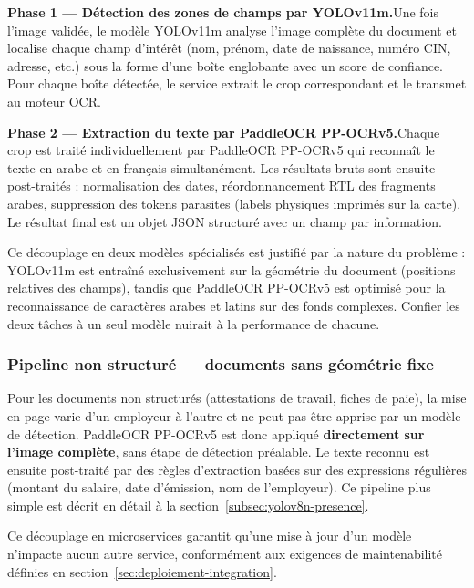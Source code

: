 \medskip
\noindent\textbf{Phase 1 — Détection des zones de champs par YOLOv11m.}\quad Une fois l'image validée, le modèle YOLOv11m analyse l'image complète du document et localise chaque champ d'intérêt (nom, prénom, date de naissance, numéro CIN, adresse, etc.) sous la forme d'une boîte englobante avec un score de confiance. Pour chaque boîte détectée, le service extrait le crop correspondant et le transmet au moteur OCR.

\medskip
\noindent\textbf{Phase 2 — Extraction du texte par PaddleOCR PP-OCRv5.}\quad Chaque crop est traité individuellement par PaddleOCR PP-OCRv5 qui reconnaît le texte en arabe et en français simultanément. Les résultats bruts sont ensuite post-traités : normalisation des dates, réordonnancement RTL des fragments arabes, suppression des tokens parasites (labels physiques imprimés sur la carte). Le résultat final est un objet JSON structuré avec un champ par information.

Ce découplage en deux modèles spécialisés est justifié par la nature du problème : YOLOv11m est entraîné exclusivement sur la géométrie du document (positions relatives des champs), tandis que PaddleOCR PP-OCRv5 est optimisé pour la reconnaissance de caractères arabes et latins sur des fonds complexes. Confier les deux tâches à un seul modèle nuirait à la performance de chacune.

\subsubsection{Pipeline non structuré --- documents sans géométrie fixe}

Pour les documents non structurés (attestations de travail, fiches de paie), la mise en page varie d'un employeur à l'autre et ne peut pas être apprise par un modèle de détection. PaddleOCR PP-OCRv5 est donc appliqué \textbf{directement sur l'image complète}, sans étape de détection préalable. Le texte reconnu est ensuite post-traité par des règles d'extraction basées sur des expressions régulières (montant du salaire, date d'émission, nom de l'employeur). Ce pipeline plus simple est décrit en détail à la section~\ref{subsec:yolov8n-presence}.

Ce découplage en microservices garantit qu'une mise à jour d'un modèle n'impacte aucun autre service, conformément aux exigences de maintenabilité définies en section~\ref{sec:deploiement-integration}.

